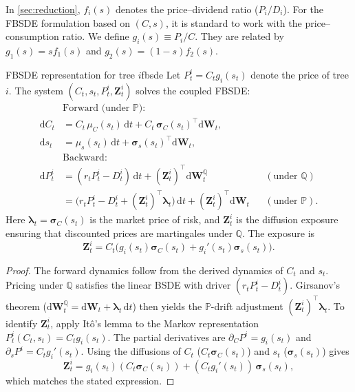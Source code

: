 ﻿\documentclass[11pt,letterpaper,oneside]{article}
\numberwithin{equation}{section}
\newcommand{\1}{\mathbf{1}}
\newcommand{\diff}{\mathrm{d}}
\begin{document}
\begin{tcolorbox}[didacticstyle, title={Notation Alert: Price Ratios}]
In \cref{sec:reduction}, $f_i(s)$ denotes the price--dividend ratio ($P_i/D_i$). For the FBSDE formulation based on $(C,s)$, it is standard to work with the price--consumption ratio. We define $g_i(s) \equiv P_i/C$. They are related by $g_1(s) = s f_1(s)$ and $g_2(s) = (1-s) f_2(s)$.
\end{tcolorbox}
\begin{proposition}{FBSDE representation for tree $i$}{fbsde}
Let $P_t^i=C_t g_i(s_t)$ denote the price of tree $i$. The system $(C_t,s_t,P_t^i,\bm{Z}_t^i)$ solves the coupled FBSDE:
\begin{align*}
  &\text{Forward (under }\mathbb{P}\text{):}\\
  \diff C_t &= C_t\,\mu_C(s_t)\,\diff t + C_t\,\bm{\sigma}_C(s_t)^{\top}\diff\bm{W}_t,\\
  \diff s_t &= \mu_s(s_t)\,\diff t + \bm{\sigma}_s(s_t)^{\top}\diff\bm{W}_t,\\
  &\text{Backward:}\\
  \diff P_t^i &= (r_t P_t^i - D_t^i)\,\diff t + (\bm{Z}_t^i)^{\top}\diff\bm{W}_t^{\mathbb{Q}} && (\text{under }\mathbb{Q})\\
              &= \big(r_t P_t^i - D_t^i + (\bm{Z}_t^i)^{\top}\bm{\lambda}_t\big)\,\diff t + (\bm{Z}_t^i)^{\top}\diff\bm{W}_t && (\text{under }\mathbb{P}).
\end{align*}
Here $\bm{\lambda}_t=\bm{\sigma}_C(s_t)$ is the market price of risk, and $\bm{Z}_t^i$ is the diffusion exposure ensuring that discounted prices are martingales under $\mathbb{Q}$. The exposure is
\[
  \bm{Z}_t^i = C_t \Big( g_i(s_t)\bm{\sigma}_C(s_t) + g_i'(s_t)\bm{\sigma}_s(s_t) \Big).
\]
\end{proposition}
\begin{proof}
The forward dynamics follow from the derived dynamics of $C_t$ and $s_t$. Pricing under $\mathbb{Q}$ satisfies the linear BSDE with driver $(r_t P_t^i-D_t^i)$. Girsanov's theorem ($\diff\bm{W}_t^{\mathbb{Q}} = \diff\bm{W}_t + \bm{\lambda}_t\,\diff t$) then yields the $\mathbb{P}$-drift adjustment $(\bm{Z}_t^i)^{\top}\bm{\lambda}_t$.
To identify $\bm{Z}_t^i$, apply It\^o's lemma to the Markov representation $P_t^i(C_t, s_t)=C_t g_i(s_t)$. The partial derivatives are $\partial_C P^i = g_i(s_t)$ and $\partial_s P^i = C_t g_i'(s_t)$. Using the diffusions of $C_t$ ($C_t\bm{\sigma}_C(s_t)$) and $s_t$ ($\bm{\sigma}_s(s_t)$) gives
\[
  \bm{Z}_t^i = g_i(s_t)(C_t\bm{\sigma}_C(s_t)) + (C_t g_i'(s_t))\,\bm{\sigma}_s(s_t),
\]
which matches the stated expression.
\end{proof}
\end{document}
